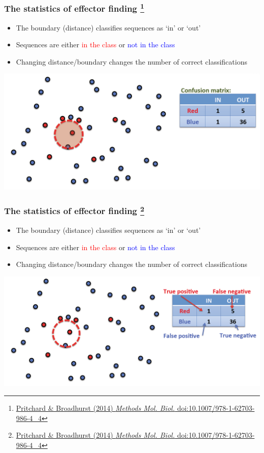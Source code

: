 \begin{frame}
  \frametitle{The statistics of effector finding
  \footnote{\tiny{\href{http://dx.doi.org/10.1007/978-1-62703-986-4_4}{Pritchard \& Broadhurst (2014) \textit{Methods Mol. Biol.} doi:10.1007/978-1-62703-986-4\_4}}}
}
  \begin{itemize}
    \item \textcolor{hutton_green}{The boundary (distance) classifies sequences as `in' or `out'}
    \item Sequences are either \textcolor{red}{in the class} or \textcolor{blue}{not in the class}
    \item \textcolor{hutton_purple}{Changing distance/boundary changes the number of correct classifications}
  \end{itemize}
  \includegraphics[width=1\textwidth]{images/finding_effectors5}    
\end{frame}

\begin{frame}
  \frametitle{The statistics of effector finding
  \footnote{\tiny{\href{http://dx.doi.org/10.1007/978-1-62703-986-4_4}{Pritchard \& Broadhurst (2014) \textit{Methods Mol. Biol.} doi:10.1007/978-1-62703-986-4\_4}}}
}
  \begin{itemize}
    \item \textcolor{hutton_green}{The boundary (distance) classifies sequences as `in' or `out'}
    \item Sequences are either \textcolor{red}{in the class} or \textcolor{blue}{not in the class}
    \item \textcolor{hutton_purple}{Changing distance/boundary changes the number of correct classifications}
  \end{itemize}
  \includegraphics[width=1\textwidth]{images/finding_effectors6}    
\end{frame}

